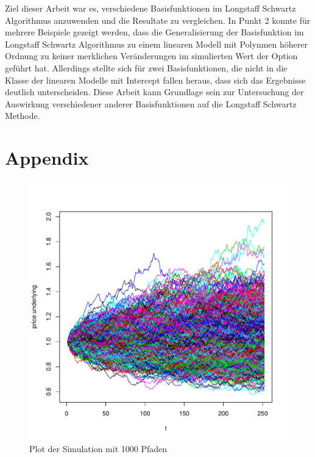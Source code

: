 \documentclass[10pt,a4paper]{article}\usepackage[]{graphicx}\usepackage[]{color}
\makeatletter
\def\maxwidth{ %
  \ifdim\Gin@nat@width>\linewidth
    \linewidth
  \else
    \Gin@nat@width
  \fi
}
\makeatother
\begin{document}
Ziel dieser Arbeit war es, verschiedene Basisfunktionen im Longstaff Schwartz Algorithmus anzuwenden und die Resultate zu vergleichen. In Punkt 2 konnte für mehrere Beispiele gezeigt werden, dass die Generalisierung der Basisfunktion im Longstaff Schwartz Algorithmus zu einem linearen Modell mit Polynmen höherer Ordnung zu keiner merklichen Veränderungen im simulierten Wert der Option geführt hat. Allerdings stellte sich für zwei Basisfunktionen, die nicht in die Klasse der linearen Modelle mit Intercept fallen heraus, dass sich das Ergebnisse deutlich unterscheiden. Diese Arbeit kann Grundlage sein zur Untersuchung der Auswirkung verschiedener anderer Basisfunktionen auf die Longstaff Schwartz Methode.

\newpage 






\section*{Appendix}

\begin{figure}[H]

\includegraphics[width=\maxwidth]{figure/unnamed-chunk-20-1} 

\caption{Plot der Simulation mit 1000 Pfaden}
\label{100P}
\end{figure}
\end{document}
